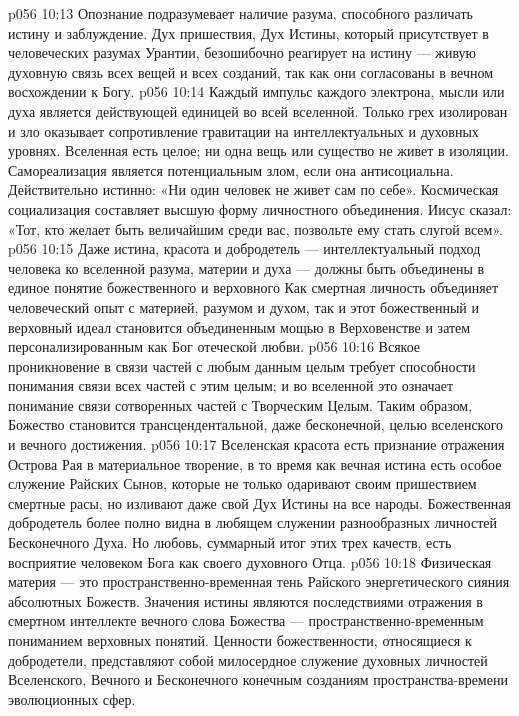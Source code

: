 \vs p056 10:13 \pc Опознание  подразумевает наличие разума, способного различать истину и заблуждение. Дух пришествия, Дух Истины, который присутствует в человеческих разумах Урантии, безошибочно реагирует на истину --- живую духовную связь всех вещей и всех созданий, так как они согласованы в вечном восхождении к Богу.
\vs p056 10:14 Каждый импульс каждого электрона, мысли или духа является действующей единицей во всей вселенной. Только грех изолирован и зло оказывает сопротивление гравитации на интеллектуальных и духовных уровнях. Вселенная есть целое; ни одна вещь или существо не живет в изоляции. Самореализация является потенциальным злом, если она антисоциальна. Действительно истинно: «Ни один человек не живет сам по себе». Космическая социализация составляет высшую форму личностного объединения. Иисус сказал: «Тот, кто желает быть величайшим среди вас, позвольте ему стать слугой всем».
\vs p056 10:15 Даже истина, красота и добродетель --- интеллектуальный подход человека ко вселенной разума, материи и духа --- должны быть объединены в единое понятие божественного и верховного  Как смертная личность объединяет человеческий опыт с материей, разумом и духом, так и этот божественный и верховный идеал становится объединенным мощью в Верховенстве и затем персонализированным как Бог отеческой любви.
\vs p056 10:16 Всякое проникновение в связи частей с любым данным целым требует способности понимания связи всех частей с этим целым; и во вселенной это означает понимание связи сотворенных частей с Творческим Целым. Таким образом, Божество становится трансцендентальной, даже бесконечной, целью вселенского и вечного достижения.
\vs p056 10:17 \pc Вселенская красота есть признание отражения Острова Рая в материальное творение, в то время как вечная истина есть особое служение Райских Сынов, которые не только одаривают своим пришествием смертные расы, но изливают даже свой Дух Истины на все народы. Божественная добродетель более полно видна в любящем служении разнообразных личностей Бесконечного Духа. Но любовь, суммарный итог этих трех качеств, есть восприятие человеком Бога как своего духовного Отца.
\vs p056 10:18 Физическая материя --- это пространственно\hyp{}временная тень Райского энергетического сияния абсолютных Божеств. Значения истины являются последствиями отражения в смертном интеллекте вечного слова Божества --- пространственно\hyp{}временным пониманием верховных понятий. Ценности божественности, относящиеся к добродетели, представляют собой милосердное служение духовных личностей Вселенского, Вечного и Бесконечного конечным созданиям пространства\hyp{}времени эволюционных сфер.
